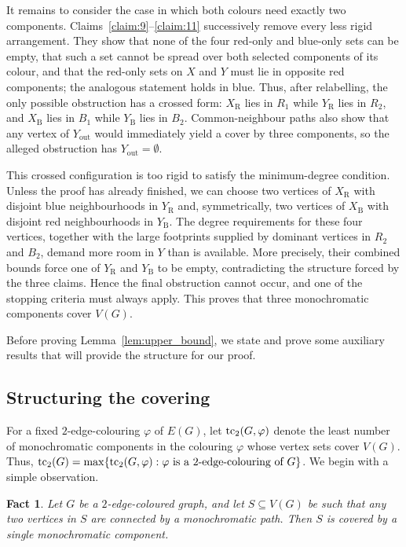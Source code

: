 \documentclass[12pt,reqno,a4paper]{amsart}
\newtheorem{fact}     [theorem] {Fact}
\def\tc{\mathop{\text{\rm tc}}\nolimits}
\newcommand{\out}{\mathrm{out}}
\newcommand{\R}{\mathrm{R}}
\newcommand{\B}{\mathrm{B}}
\begin{document}
It remains to consider the case in which both colours need exactly two
components. Claims~\ref{claim:9}--\ref{claim:11} successively remove every less
rigid arrangement. They show that none of the four red-only and blue-only sets
can be empty, that such a set cannot be spread over both selected components of
its colour, and that the red-only sets on $X$ and $Y$ must lie in opposite red
components; the analogous statement holds in blue. Thus, after relabelling, the
only possible obstruction has a crossed form: $X_{\R}$ lies in $R_1$ while
$Y_{\R}$ lies in $R_2$, and $X_{\B}$ lies in $B_1$ while $Y_{\B}$ lies in $B_2$.
Common-neighbour paths also show that any vertex of $Y_{\out}$ would immediately
yield a cover by three components, so the alleged obstruction has
$Y_{\out}=\emptyset$.

This crossed configuration is too rigid to satisfy the minimum-degree condition.
Unless the proof has already finished, we can choose two vertices of $X_{\R}$
with disjoint blue neighbourhoods in $Y_{\R}$ and, symmetrically, two vertices
of $X_{\B}$ with disjoint red neighbourhoods in $Y_{\B}$. The degree
requirements for these four vertices, together with the large footprints
supplied by dominant vertices in $R_2$ and $B_2$, demand more room in $Y$ than
is available. More precisely, their combined bounds force one of $Y_{\R}$ and
$Y_{\B}$ to be empty, contradicting the structure forced by the three claims.
Hence the final obstruction cannot occur, and one of the stopping criteria must
always apply. This proves that three monochromatic components cover $V(G)$.

Before proving Lemma~\ref{lem:upper_bound}, we state and prove some auxiliary
results that will provide the structure for our proof.

\subsection{Structuring the covering}

For a fixed $2$-edge-colouring $\varphi$ of $E(G)$, let $\tc_2(G,\varphi)$
denote the least number of monochromatic components in the colouring $\varphi$
whose vertex sets cover $V(G)$. Thus, $\tc_2(G)=\max\{\tc_2(G,\varphi) :
\varphi\text{ is a $2$-edge-colouring of $G$}\}$. We begin with a simple observation.

\begin{fact}\label{fact:auxiliary}
    Let $G$ be a $2$-edge-coloured graph, and let $S\subseteq V(G)$ be such that any two vertices in $S$ are connected by a monochromatic path. Then $S$ is covered by a single monochromatic component. 
\end{fact}
\end{document}
